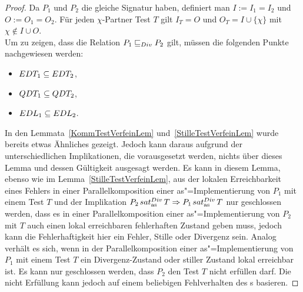 \begin{proof}
  Da $P_1$ und $P_2$ die gleiche Signatur haben, definiert man $I:=I_1=I_2$ und
  $O:=O_1=O_2$. Für jeden $\chi$-Partner Test $T$ gilt $I_T=O$ und
  $O_T=I\cup\{\chi\}$ mit $\chi\notin I\cup O$.\\
  Um zu zeigen, dass die Relation $P_1 \sqsubseteq  _{Div} P_2$ gilt, müssen die folgenden
  Punkte nachgewiesen werden:
  \begin{itemize}
    \item $EDT _1\subseteq EDT _2$,
    \item $QDT _1\subseteq QDT _2$,
    \item $EDL _1\subseteq EDL _2$.
  \end{itemize}
  In den Lemmata~\ref{KommTestVerfeinLem} und~\ref{StilleTestVerfeinLem} wurde
  bereits etwas Ähnliches gezeigt. Jedoch kann daraus aufgrund der
  unterschiedlichen Implikationen, die vorausgesetzt werden, nichts über dieses
  Lemma und dessen Gültigkeit ausgesagt werden. Es kann in diesem Lemma, ebenso
  wie im Lemma~\ref{StilleTestVerfeinLem}, aus der lokalen Erreichbarkeit eines
  Fehlers in einer Parallelkomposition einer as"=Implementierung von $P_1$ mit
  einem Test $T$ und der Implikation $P_2 \hspace{0.05cm}sat_\mathrm{as}^{Div}\hspace{0.05cm} T\Rightarrow P_1 \hspace{0.05cm}sat_\mathrm{as}^{Div}\hspace{0.05cm} T$
  nur geschlossen werden, dass es in einer Parallelkomposition einer
  as"=Implementierung von $P_2$ mit $T$ auch einen lokal erreichbaren
  fehlerhaften Zustand geben muss, jedoch kann die Fehlerhaftigkeit hier ein
  Fehler, Stille oder Divergenz sein. Analog verhält es sich, wenn in der
  Parallelkomposition einer as"=Implementierung von $P_1$ mit einem Test $T$
  ein Divergenz-Zustand oder stiller Zustand lokal erreichbar ist. Es kann nur
  geschlossen werden, dass $P_2$ den Test $T$ nicht erfüllen darf. Die nicht
  Erfüllung kann jedoch auf einem beliebigen Fehlverhalten des \MEIO{}s
  basieren.


\end{proof}

